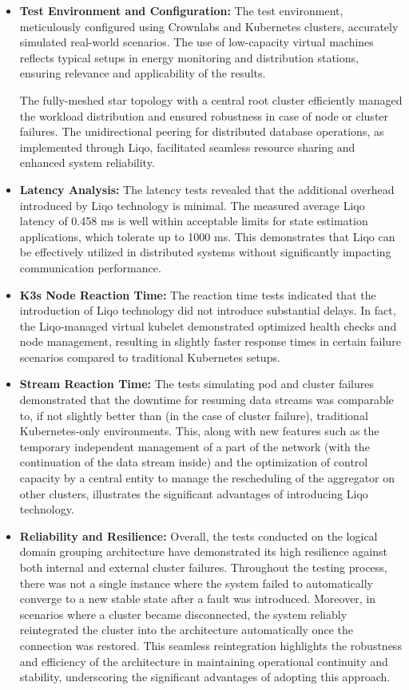 \begin{itemize}
\item \textbf{Test Environment and Configuration:} The test environment, meticulously configured using Crownlabs and Kubernetes clusters, accurately simulated real-world scenarios. The use of low-capacity virtual machines reflects typical setups in energy monitoring and distribution stations, ensuring relevance and applicability of the results. 

The fully-meshed star topology with a central root cluster efficiently managed the workload distribution and ensured robustness in case of node or cluster failures. The unidirectional peering for distributed database operations, as implemented through Liqo, facilitated seamless resource sharing and enhanced system reliability.

\item \textbf{Latency Analysis:} The latency tests revealed that the additional overhead introduced by Liqo technology is minimal. The measured average Liqo latency of 0.458 ms is well within acceptable limits for state estimation applications, which tolerate up to 1000 ms. This demonstrates that Liqo can be effectively utilized in distributed systems without significantly impacting communication performance.

\item \textbf{K3s Node Reaction Time:} The reaction time tests indicated that the introduction of Liqo technology did not introduce substantial delays. In fact, the Liqo-managed virtual kubelet demonstrated optimized health checks and node management, resulting in slightly faster response times in certain failure scenarios compared to traditional Kubernetes setups.

\item \textbf{Stream Reaction Time:} The tests simulating pod and cluster failures demonstrated that the downtime for resuming data streams was comparable to, if not slightly better than (in the case of cluster failure), traditional Kubernetes-only environments. This, along with new features such as the temporary independent management of a part of the network (with the continuation of the data stream inside) and the optimization of control capacity by a central entity to manage the rescheduling of the aggregator on other clusters, illustrates the significant advantages of introducing Liqo technology.

\item \textbf{Reliability and Resilience:} Overall, the tests conducted on the logical domain grouping architecture have demonstrated its high resilience against both internal and external cluster failures. Throughout the testing process, there was not a single instance where the system failed to automatically converge to a new stable state after a fault was introduced. Moreover, in scenarios where a cluster became disconnected, the system reliably reintegrated the cluster into the architecture automatically once the connection was restored. This seamless reintegration highlights the robustness and efficiency of the architecture in maintaining operational continuity and stability, underscoring the significant advantages of adopting this approach.


\end{itemize}
